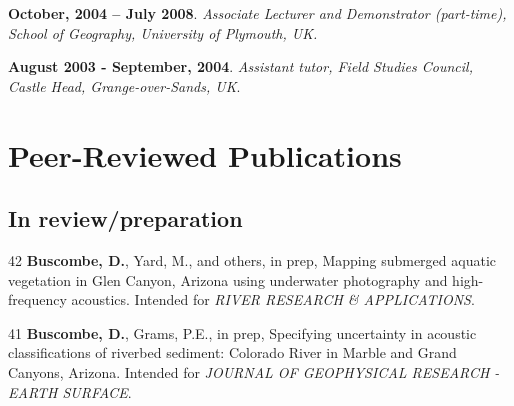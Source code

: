 \documentclass[margin,line]{resume}
\begin{document}
\begin{resume}
\begin{footnotesize}
    {\bf October, 2004 -- July 2008}. {\sl Associate Lecturer and Demonstrator (part-time), School of Geography, University of Plymouth, UK.}

    {\bf August 2003 - September, 2004}. {\sl Assistant tutor, Field Studies Council, Castle Head, Grange-over-Sands, UK}. %
        \end{footnotesize}

    \section{\mysidestyle Peer-Reviewed Publications}

    \begin{footnotesize}
    

	\subsection{\mysidestyle In review/preparation}
	\begin{list1}


	\item[42] {\bf Buscombe, D.}, Yard, M., and others, in prep, Mapping submerged aquatic vegetation in Glen Canyon, Arizona using underwater photography and high-frequency acoustics. Intended for {\sl RIVER RESEARCH \& APPLICATIONS}.\\

	\item[41] {\bf Buscombe, D.}, Grams, P.E., in prep, Specifying uncertainty in acoustic classifications of riverbed sediment: Colorado River in Marble and Grand Canyons, Arizona. Intended for {\sl JOURNAL OF GEOPHYSICAL RESEARCH - EARTH SURFACE}.\\


\end{list1}
\end{footnotesize}
\end{resume}
\end{document}
